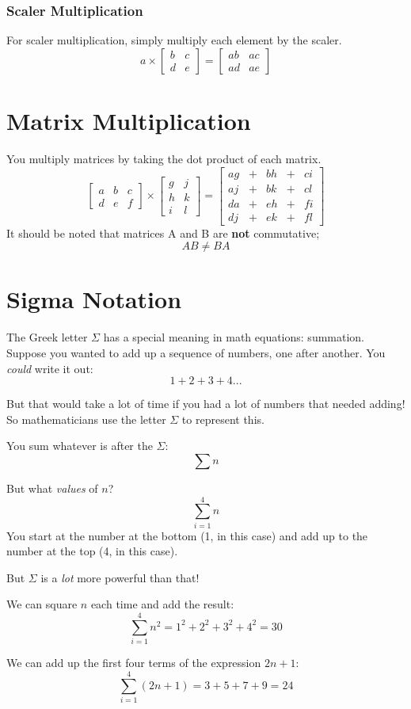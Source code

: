 \documentclass{article}
\begin{document}
\subsubsection{Scaler Multiplication}
	For scaler multiplication, simply multiply each element by the scaler.
	$$
	a
	\times
	\begin{bmatrix}
		b & c \\
		d & e
	\end{bmatrix}
	= 
	\begin{bmatrix}
		ab & ac \\
		ad & ae
	\end{bmatrix}
	$$

\section{Matrix Multiplication}
You multiply matrices by taking the dot product of each matrix. 
$$
\begin{bmatrix}
	a & b & c \\
	d & e & f
\end{bmatrix}
\times
\begin{bmatrix}
	g & j \\
	h & k \\
	i & l
\end{bmatrix}
= 
\begin{bmatrix}
ag & + & bh & + & ci \\
aj & + & bk & + & cl \\
da & + & eh & + & fi \\
dj & + & ek & + & fl
\end{bmatrix}
$$
It should be noted that matrices A and B are \textbf{not} commutative; 
$$AB \ne BA$$

\section{Sigma Notation}
The Greek letter $\Sigma$ has a special meaning in math equations: summation. 
Suppose you wanted to add up a sequence of numbers, one after another. You \textit{could} write it out:
$$1 + 2 + 3 + 4...$$

But that would take a lot of time if you had a lot of numbers that needed adding! So mathematicians use the letter $\Sigma$ to represent this. 

You sum whatever is after the $\Sigma$:
$$\sum n$$

But what \textit{values} of $n$?
$$\sum_{i=1}^{4} n$$
You start at the number at the bottom (1, in this case) and add up to the number at the top (4, in this case).

But $\Sigma$ is a \textit{lot} more powerful than that!

We can square $n$ each time and add the result: 
$$\sum_{i=1}^{4} n^2 = 1^2 + 2^2 + 3^2 + 4^2 = 30$$

We can add up the first four terms of the expression $2n+1$:
$$\sum_{i=1}^{4} (2n+1) = 3 + 5 + 7 + 9 = 24$$
\end{document}

